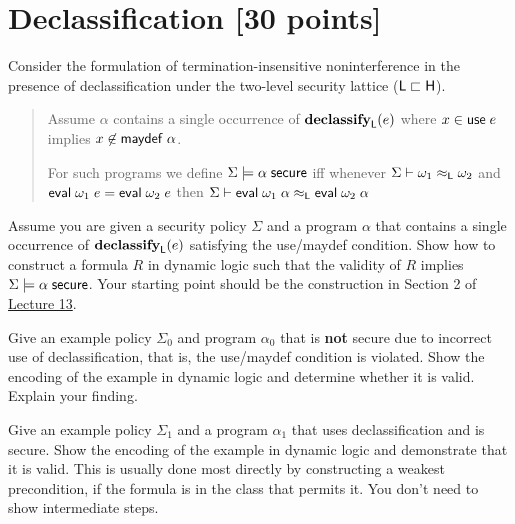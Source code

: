 \documentclass[11pt]{article}
\newcommand{\courseurl}{https://15316-cmu.github.io/2026/}
\begin{document}
\section{Declassification [30 points]}

Consider the formulation of termination-insensitive noninterference in the
presence of declassification under the two-level security lattice
($\mathsf{L} \sqsubset \mathsf{H}$).

\begin{quote}
  Assume $\alpha$ contains a single occurrence of $\mathbf{declassify}_{\mathsf{L}}(e)$
  where $x \in \mathsf{use}\; e$ implies $x \not\in \mathsf{maydef}\; \alpha$.
  \par \medskip For such programs we define
  $\Sigma \models \alpha\; \mathsf{secure}$ iff \newline whenever
  $\Sigma \vdash \omega_1 \approx_{\mathsf{L}} \omega_2$ \newline and
  $\mathsf{eval}\; \omega_1\; e = \mathsf{eval}\; \omega_2\; e$ \newline then
  $\Sigma \vdash \mathsf{eval}\; \omega_1\; \alpha \approx_{\mathsf{L}} \mathsf{eval}\; \omega_2\;
  \alpha$
\end{quote}

\begin{task}[20 points]\rm
  Assume you are given a security policy $\Sigma$ and a program $\alpha$ that
  contains a single occurrence of $\mathbf{declassify}_{\mathsf{L}}(e)$ satisfying the
  use/maydef condition.  Show how to construct a formula $R$ in dynamic logic
  such that the validity of $R$ implies $\Sigma \models \alpha\; \mathsf{secure}$.
  Your starting point should be the construction in Section 2 of
  \href{\courseurl/lectures/13-declassification.pdf}{Lecture 13}.
\end{task}

\begin{task}[5 points]\rm
  Give an example policy $\Sigma_0$ and program $\alpha_0$ that is \textbf{not}
  secure due to incorrect use of declassification, that is, the use/maydef
  condition is violated.  Show the encoding of the example in dynamic logic and
  determine whether it is valid.  Explain your finding.
\end{task}

\begin{task}[5 points]\rm
  Give an example policy $\Sigma_1$ and a program $\alpha_1$ that uses
  declassification and is secure.  Show the encoding of the example in dynamic
  logic and demonstrate that it is valid.  This is usually done most directly by
  constructing a weakest precondition, if the formula is in the class that
  permits it.  You don't need to show intermediate steps.
\end{task}
\end{document}
